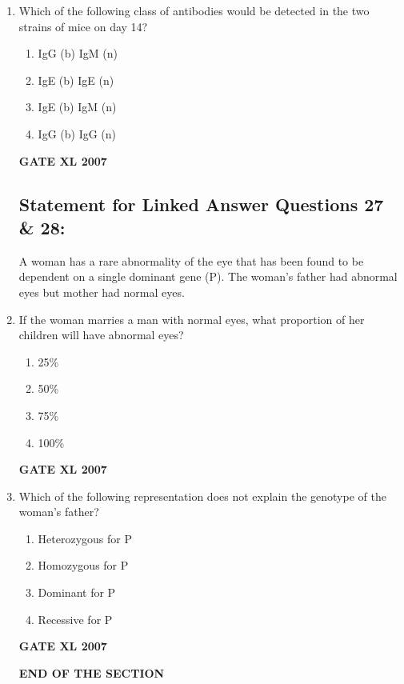 \documentclass[journal,12pt,onecolumn]{IEEEtran}
\begin{document}
\begin{enumerate}
\item Which of the following class of antibodies would be detected in the two strains of mice on day 14?
\begin{enumerate}
    \item IgG (b) IgM (n)
    \item IgE (b) IgE (n)
    \item IgE (b) IgM (n)
    \item IgG (b) IgG (n)
\end{enumerate}\hfill{\textbf{GATE XL 2007}}

\vspace{2em}

\subsection*{Statement for Linked Answer Questions 27 \& 28:}
A woman has a rare abnormality of the eye that has been found to be dependent on a single dominant gene (P). The woman's father had abnormal eyes but mother had normal eyes.

\item If the woman marries a man with normal eyes, what proportion of her children will have abnormal eyes?
\begin{enumerate}
    \item 25\%
    \item 50\%
    \item 75\%
    \item 100\%
\end{enumerate}\hfill{\textbf{GATE XL 2007}}

\item Which of the following representation does not explain the genotype of the woman's father?
\begin{enumerate}
    \item Heterozygous for P
    \item Homozygous for P
    \item Dominant for P
    \item Recessive for P
\end{enumerate}\hfill{\textbf{GATE XL 2007}}

\begin{center}
\textbf{END OF THE SECTION}
\end{center}
\end{enumerate}
\end{document}
